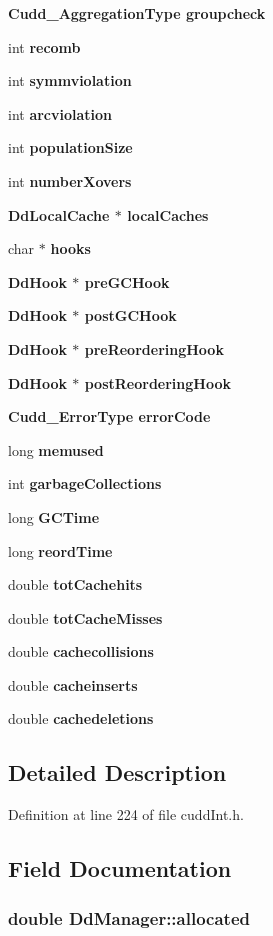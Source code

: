 \begin{CompactItemize}
\bf{Cudd\_\-Aggregation\-Type} \bf{groupcheck}
\item 
int \bf{recomb}
\item 
int \bf{symmviolation}
\item 
int \bf{arcviolation}
\item 
int \bf{population\-Size}
\item 
int \bf{number\-Xovers}
\item 
\bf{Dd\-Local\-Cache} $\ast$ \bf{local\-Caches}
\item 
char $\ast$ \bf{hooks}
\item 
\bf{Dd\-Hook} $\ast$ \bf{pre\-GCHook}
\item 
\bf{Dd\-Hook} $\ast$ \bf{post\-GCHook}
\item 
\bf{Dd\-Hook} $\ast$ \bf{pre\-Reordering\-Hook}
\item 
\bf{Dd\-Hook} $\ast$ \bf{post\-Reordering\-Hook}
\item 
\bf{Cudd\_\-Error\-Type} \bf{error\-Code}
\item 
long \bf{memused}
\item 
int \bf{garbage\-Collections}
\item 
long \bf{GCTime}
\item 
long \bf{reord\-Time}
\item 
double \bf{tot\-Cachehits}
\item 
double \bf{tot\-Cache\-Misses}
\item 
double \bf{cachecollisions}
\item 
double \bf{cacheinserts}
\item 
double \bf{cachedeletions}
\end{CompactItemize}


\subsection{Detailed Description}




Definition at line 224 of file cudd\-Int.h.

\subsection{Field Documentation}
\subsubsection{\setlength{\rightskip}{0pt plus 5cm}double \bf{Dd\-Manager::allocated}}\label{structDdManager_3bc65a8323c85495c64877963eb34845}




